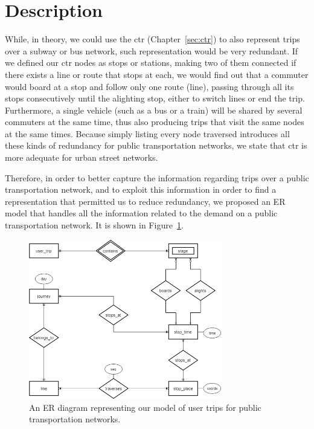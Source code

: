 \section{Description}
    \label{sec:newctr:desc}
	While, in theory, we could use the \gls{ctr} (Chapter~\ref{sec:ctr}) to also represent trips over a subway or bus network, such representation would be very redundant. If we defined our \gls{ctr} nodes as stops or stations, making two of them connected if there exists a line or route that stops at each, we would find out that a commuter would board at a stop and follow only one route (line), passing through all its stops consecutively until the alighting stop, either to switch lines or end the trip. Furthermore, a single vehicle (such as a bus or a train) will be shared by several commuters at the same time, thus also producing trips that visit the same nodes at the same times. Because simply listing every node traversed introduces all these kinds of redundancy for public transportation networks, we state that \gls{ctr} is more adequate for urban street networks.
	
	Therefore, in order to better capture the information regarding trips over a public transportation network, and to exploit this information in order to find a representation that permitted us to reduce redundancy, we proposed an ER model that handles all the information related to the demand on a public transportation network. It is shown in Figure~\ref{fig:er}.
	
	\begin{figure}[ht]
	    \begin{center}
        \includegraphics[width=0.75\textwidth]{figures/network_er.png}
        \caption{An ER diagram representing our model of user trips for public transportation networks.}
        \label{fig:er}
        \end{center}
    \end{figure}
    
